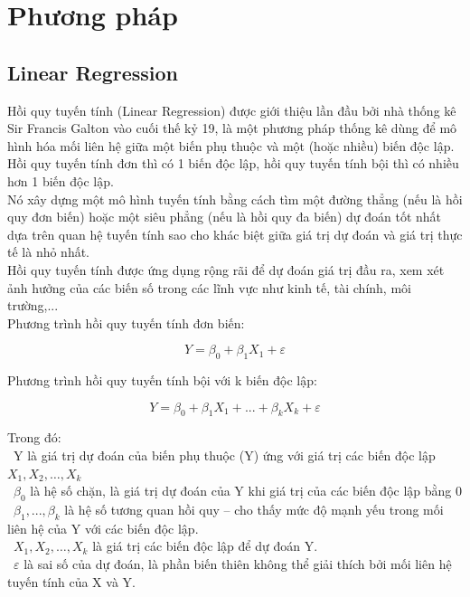 \documentclass[conference]{IEEEtran}
\begin{document}
\section{Phương pháp}

\subsection{Linear Regression}
Hồi quy tuyến tính (Linear Regression) được giới thiệu lần đầu bởi nhà thống kê Sir Francis Galton vào cuối thế kỷ 19, là một phương pháp thống kê dùng để mô hình hóa mối liên hệ giữa một biến phụ thuộc và một (hoặc nhiều) biến độc lập. Hồi quy tuyến tính đơn thì có 1 biến độc lập, hồi quy tuyến tính bội thì có nhiều hơn 1 biến độc lập.\\
Nó xây dựng một mô hình tuyến tính bằng cách tìm một đường thẳng (nếu là hồi quy đơn biến) hoặc một siêu phẳng (nếu là hồi quy đa biến) dự đoán tốt nhất dựa trên quan hệ tuyến tính sao cho khác biệt giữa giá trị dự đoán và giá trị thực tế là nhỏ nhất.\\
Hồi quy tuyến tính được ứng dụng rộng rãi để dự đoán giá trị đầu ra, xem xét ảnh hưởng của các biến số trong các lĩnh vực như kinh tế, tài chính, môi trường,...\\
Phương trình hồi quy tuyến tính đơn biến: 
\begin{samepage}
\[Y=\beta_0+\beta_1X_1+\varepsilon\]
\end{samepage}
Phương trình hồi quy tuyến tính bội với k biến độc lập:
\begin{samepage}
\[Y=\beta_0+\beta_1X_1+...+\beta_kX_k+\varepsilon\]
\end{samepage}
Trong đó:\\
        \indent\textbullet\ Y là giá trị dự đoán của biến phụ thuộc (Y) ứng với giá trị các biến độc lập \(X_1, X_2, \ldots, X_k\)\\
        \indent\textbullet\ \(\beta_0\) là hệ số chặn, là giá trị dự đoán của Y khi giá trị của các biến độc lập bằng 0\\
        \indent\textbullet\ \(\beta_1,..., \beta_k\) là hệ số tương quan hồi quy – cho thấy mức độ mạnh yếu trong mối liên hệ của Y với các biến độc lập.\\
        \indent\textbullet\ \(X_1, X_2, \ldots, X_k\) là giá trị các biến độc lập để dự đoán Y.\\
        \indent\textbullet\ \(\varepsilon\) là sai số của dự đoán, là phần biến thiên không thể giải thích bởi mối liên hệ tuyến tính của X và Y.
\end{document}
